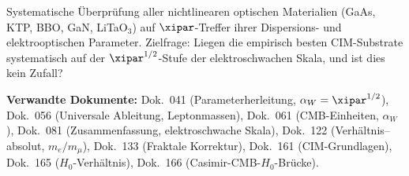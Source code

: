 \bigskip

\begin{important}
Systematische Überprüfung aller nichtlinearen optischen Materialien
(GaAs, KTP, BBO, GaN, LiTaO$_3$) auf $\xipar$-Treffer ihrer Dispersions-
und elektrooptischen Parameter. Zielfrage: Liegen die empirisch besten
CIM-Substrate systematisch auf der $\xipar^{1/2}$-Stufe der elektroschwachen
Skala, und ist dies kein Zufall?
\end{important}

\bigskip\bigskip

\noindent\textbf{Verwandte Dokumente:}
Dok.~041 (Parameterherleitung, $\alpha_W = \xipar^{1/2}$),
Dok.~056 (Universale Ableitung, Leptonmassen),
Dok.~061 (CMB-Einheiten, $\alpha_W$),
Dok.~081 (Zusammenfassung, elektroschwache Skala),
Dok.~122 (Verhältnis–absolut, $m_e/m_\mu$),
Dok.~133 (Fraktale Korrektur),
Dok.~161 (CIM-Grundlagen),
Dok.~165 ($H_0$-Verhältnis),
Dok.~166 (Casimir-CMB-$H_0$-Brücke).
